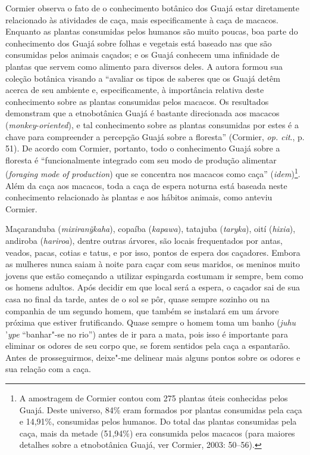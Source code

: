 Cormier observa o fato de o conhecimento botânico dos Guajá estar
diretamente relacionado às atividades de caça, mais especificamente à
caça de macacos. Enquanto as plantas consumidas pelos humanos são muito
poucas, boa parte do conhecimento dos Guajá sobre folhas e vegetais está
baseado nas que são consumidas pelos animais caçados; e os Guajá
conhecem uma infinidade de plantas que servem como alimento para
diversos deles. A autora formou sua coleção botânica visando a ``avaliar
os tipos de saberes que os Guajá detêm acerca de seu ambiente e,
especificamente, à importância relativa deste conhecimento sobre as
plantas consumidas pelos macacos. Os resultados demonstram que a
etnobotânica Guajá é bastante direcionada aos macacos
(\emph{monkey}-\emph{oriented}), e tal conhecimento sobre as plantas
consumidas por estes é a chave para compreender a percepção Guajá sobre
a floresta'' (Cormier, \emph{op. cit}., p. 51). De acordo com Cormier, portanto,
todo o conhecimento Guajá sobre a floresta é ``funcionalmente integrado
com seu modo de produção alimentar (\emph{foraging} \emph{mode}
\emph{of} \emph{production}) que se concentra nos macacos como caça''
(\emph{idem})\footnote{A amostragem de Cormier contou com 275 plantas úteis
  conhecidas pelos Guajá. Deste universo, 84\% eram formados por plantas
  consumidas pela caça e 14,91\%, consumidas pelos humanos. Do total das
  plantas consumidas pela caça, mais da metade (51,94\%) era consumida
  pelos macacos (para maiores detalhes sobre a etnobotânica Guajá, ver
  Cormier, 2003: 50--56).}. Além da caça aos macacos, toda a caça de
espera noturna está baseada neste conhecimento relacionado às plantas e
aos hábitos animais, como anteviu Cormier.

Maçaranduba (\emph{mixiranỹkaha}), copaíba (\emph{kapawa}), tatajuba
(\emph{taryka}), oití (\emph{hixia}), andiroba (\emph{hariroa}), dentre
outras árvores, são locais frequentados por antas, veados, pacas, cotias
e tatus, e por isso, pontos de espera dos caçadores. Embora as mulheres
nunca saiam à noite para caçar com seus maridos, os meninos muito jovens
que estão começando a utilizar espingarda costumam ir sempre, bem como
os homens adultos. Após decidir em que local será a espera, o caçador
sai de sua casa no final da tarde, antes de o sol se pôr, quase sempre
sozinho ou na companhia de um segundo homem, que também se instalará em
um árvore próxima que estiver frutificando. Quase sempre o homem toma um
banho (\emph{juhu} '\emph{ype} ``banhar"-se no rio'') antes de ir para a
mata, pois isso é importante para eliminar os odores de seu corpo que,
se forem sentidos pela caça a espantarão. Antes de prosseguirmos,
deixe"-me delinear mais alguns pontos sobre os odores e sua relação com a
caça.


